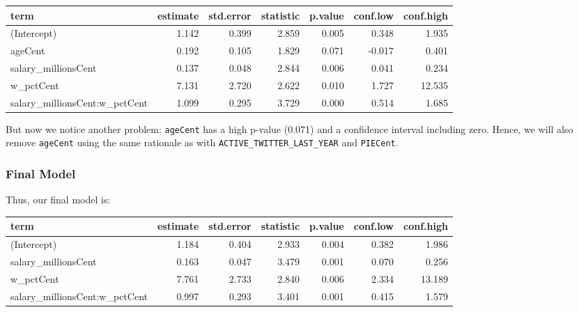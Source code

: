 \documentclass[]{article}
\newenvironment{Shaded}{\begin{snugshade}}{\end{snugshade}}
\newcommand{\DataTypeTok}[1]{\textcolor[rgb]{0.13,0.29,0.53}{#1}}
\newcommand{\DecValTok}[1]{\textcolor[rgb]{0.00,0.00,0.81}{#1}}
\newcommand{\KeywordTok}[1]{\textcolor[rgb]{0.13,0.29,0.53}{\textbf{#1}}}
\newcommand{\NormalTok}[1]{#1}
\newcommand{\OperatorTok}[1]{\textcolor[rgb]{0.81,0.36,0.00}{\textbf{#1}}}
\newcommand{\OtherTok}[1]{\textcolor[rgb]{0.56,0.35,0.01}{#1}}
\newcommand{\StringTok}[1]{\textcolor[rgb]{0.31,0.60,0.02}{#1}}
\begin{document}
\begin{longtable}[]{@{}lrrrrrr@{}}
\toprule
term & estimate & std.error & statistic & p.value & conf.low &
conf.high\tabularnewline
\midrule
\endhead
(Intercept) & 1.142 & 0.399 & 2.859 & 0.005 & 0.348 &
1.935\tabularnewline
ageCent & 0.192 & 0.105 & 1.829 & 0.071 & -0.017 & 0.401\tabularnewline
salary\_millionsCent & 0.137 & 0.048 & 2.844 & 0.006 & 0.041 &
0.234\tabularnewline
w\_pctCent & 7.131 & 2.720 & 2.622 & 0.010 & 1.727 &
12.535\tabularnewline
salary\_millionsCent:w\_pctCent & 1.099 & 0.295 & 3.729 & 0.000 & 0.514
& 1.685\tabularnewline
\bottomrule
\end{longtable}

But now we notice another problem: \texttt{ageCent} has a high p-value
(0.071) and a confidence interval including zero. Hence, we will also
remove \texttt{ageCent} using the same rationale as with
\texttt{ACTIVE\_TWITTER\_LAST\_YEAR} and \texttt{PIECent}.

\hypertarget{final-model}{%
\subsubsection{Final Model}\label{final-model}}

Thus, our final model is:

\begin{Shaded}
\end{Shaded}

\begin{longtable}[]{@{}lrrrrrr@{}}
\toprule
term & estimate & std.error & statistic & p.value & conf.low &
conf.high\tabularnewline
\midrule
\endhead
(Intercept) & 1.184 & 0.404 & 2.933 & 0.004 & 0.382 &
1.986\tabularnewline
salary\_millionsCent & 0.163 & 0.047 & 3.479 & 0.001 & 0.070 &
0.256\tabularnewline
w\_pctCent & 7.761 & 2.733 & 2.840 & 0.006 & 2.334 &
13.189\tabularnewline
salary\_millionsCent:w\_pctCent & 0.997 & 0.293 & 3.401 & 0.001 & 0.415
& 1.579\tabularnewline
\bottomrule
\end{longtable}
\end{document}
